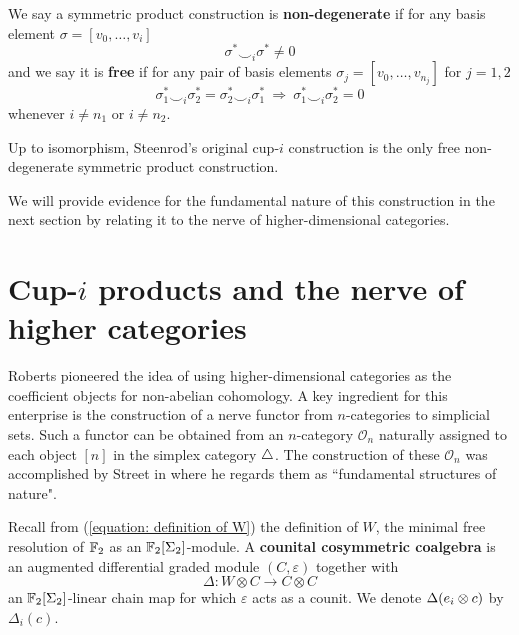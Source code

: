 We say a symmetric product construction is \textbf{non-degenerate} if for any basis element $\sigma = [v_0, \dots, v_i]$
\begin{equation*}
\boxed{\sigma^* \smallsmile_{i} \sigma^* \neq 0}
\end{equation*}
and we say it is \textbf{free} if for any pair of basis elements $\sigma_j = [v_0, \dots, v_{n_j}]$ for $j = 1, 2$
\begin{equation*}
\boxed{\sigma^*_1 \smallsmile_{i} \sigma^*_2 = \sigma^*_2 \smallsmile_{i} \sigma^*_1}\
\Longrightarrow\
\boxed{\sigma^*_1 \smallsmile_{i} \sigma^*_2 = 0}
\end{equation*}
whenever $i \neq n_1$ or $i \neq n_2$.

\begin{theorem} 
	Up to isomorphism, Steenrod's original cup-$i$ construction \cite{steenrod1947products} is the only free non-degenerate symmetric product construction.
\end{theorem}

We will provide evidence for the fundamental nature of this construction in the next section by relating it to the nerve of higher-dimensional categories.

\section{Cup-$i$ products and the nerve of higher categories}

Roberts \cite{roberts1977mathematical} pioneered the idea of using higher-dimensional categories as the coefficient objects for non-abelian cohomology.
A key ingredient for this enterprise is the construction of a nerve functor from \mbox{$n$-categories} to simplicial sets.
Such a functor can be obtained from an $n$-category $\mathcal{O}_n$ naturally assigned to each object $[n]$ in the simplex category $\triangle$.
The construction of these $\mathcal O_n$ was accomplished by Street in \cite{street1987orientals} where he regards them as ``fundamental structures of nature".

Recall from (\ref{equation: definition of W}) the definition of $W$, the minimal free resolution of ${\mathbb{F}_2}$ as an ${\mathbb{F}_2}[\Sigma_2]$-module.
A \textbf{counital cosymmetric coalgebra} is an augmented differential graded module $(C, \varepsilon)$ together with
\begin{equation*}
\Delta : W \otimes C \to C \otimes C
\end{equation*}
an ${\mathbb{F}_2}[\Sigma_2]$-linear chain map for which $\varepsilon$ acts as a counit.
We denote $\Delta(e_i \otimes c)$ by $\Delta_i(c)$.

